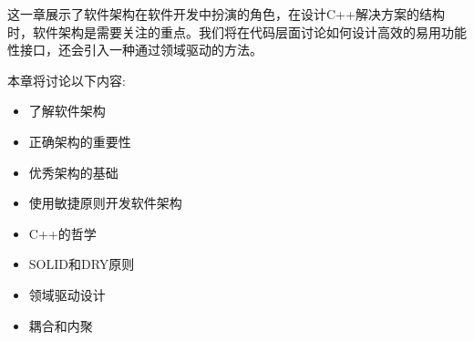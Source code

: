 
这一章展示了软件架构在软件开发中扮演的角色，在设计C++解决方案的结构时，软件架构是需要关注的重点。我们将在代码层面讨论如何设计高效的易用功能性接口，还会引入一种通过领域驱动的方法。

本章将讨论以下内容:

\begin{itemize}
\item 了解软件架构
\item 正确架构的重要性
\item 优秀架构的基础
\item 使用敏捷原则开发软件架构
\item C++的哲学
\item SOLID和DRY原则
\item 领域驱动设计
\item 耦合和内聚
\end{itemize}